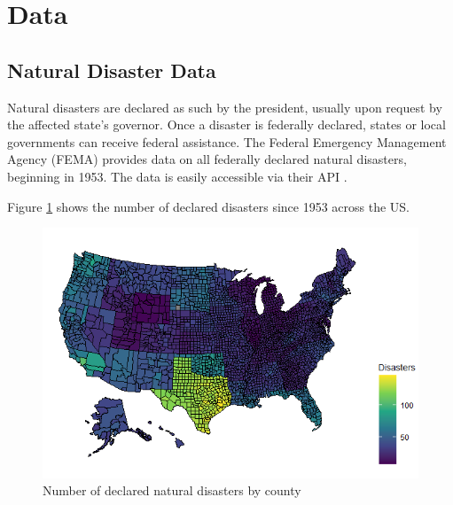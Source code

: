 
\section{Data}

\subsection{Natural Disaster Data}

Natural disasters are declared as such by the president, usually upon request by the affected state's governor. Once a disaster is federally declared, states or local governments can receive federal assistance. The Federal Emergency Management Agency (FEMA) provides data on all federally declared natural disasters, beginning in 1953. The data is easily accessible via their API \citep{rfema}.



Figure \ref{DisasterMap} shows the number of declared disasters since 1953 across the US.


\begin{figure}[!h]
	\centering
	\includegraphics[scale=0.7]{"../Code & Data/DisasterMap.png"}
	\caption{Number of declared natural disasters by county}
	\label{DisasterMap}
\end{figure}




